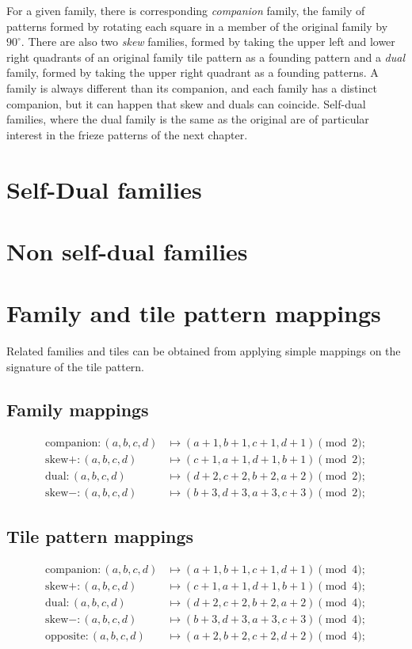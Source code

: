 \documentclass{tufte-book}
\begin{document}
\noindent
For a given family, there is corresponding \textit{companion} family, the family of patterns formed by rotating each square in a member of the original family by $90^{\circ}$.  There are also two \textit{skew} families, formed by taking the upper left and lower right quadrants of an original family tile pattern as a founding pattern and a \textit{dual} family, formed by taking the upper right quadrant as a founding patterns. A family is always different than its companion, and each family has a distinct companion, but it can happen that skew and duals can coincide. Self-dual families, where the dual family is the same as the original are of particular interest in the frieze patterns of the next chapter.

\section{Self-Dual families}


\section{Non self-dual families}


\section{Family and tile pattern mappings}

\marginnote{\centering} 
Related families and tiles can be obtained from applying simple mappings on the signature of the tile pattern.

\subsection{Family mappings}
\begin{align*}        \text{companion}: (a,b,c,d) &\mapsto (a+1, b+1, c+ 1, d+1) \pmod{2};\\
    \text{skew}+ : (a,b,c,d) &\mapsto (c+1, a+1, d+ 1, b+1) \pmod{2};\\
    \text{dual} : (a,b,c,d) &\mapsto (d+2, c+2, b+ 2, a+2) \pmod{2};\\
    \text{skew}- : (a,b,c,d) &\mapsto (b+3, d+3, a+ 3, c+3) \pmod{2};
\end{align*}

\subsection{Tile pattern mappings}
\marginnote{\centering}
\begin{align*}        \text{companion}: (a,b,c,d) &\mapsto (a+1, b+1, c+ 1, d+1) \pmod{4};\\
    \text{skew}+ : (a,b,c,d) &\mapsto (c+1, a+1, d+ 1, b+1) \pmod{4};\\
    \text{dual} : (a,b,c,d) &\mapsto (d+2, c+2, b+ 2, a+2) \pmod{4};\\
    \text{skew}- : (a,b,c,d) &\mapsto (b+3, d+3, a+ 3, c+3) \pmod{4};\\
    \text{opposite} : (a,b,c,d) &\mapsto (a+2, b+2, c+2, d+2) \pmod{4};
\end{align*}
\end{document}
